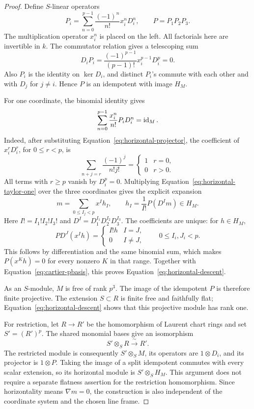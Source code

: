 \begin{proof}
Define \(S\)-linear operators
\begin{equation}
 P_i=\sum_{n=0}^{p-1}\frac{(-1)^n}{n!}x_i^nD_i^n,
 \qquad P=P_1P_2P_3.
 \label{eq:horizontal-projector}
\end{equation}
The multiplication operator \(x_i^n\) is placed on the left.
All factorials here are invertible in \(k\).
The commutator relation gives a telescoping sum
\[
 D_iP_i=\frac{(-1)^{p-1}}{(p-1)!}x_i^{p-1}D_i^p=0.
\]
Also \(P_i\) is the identity on \(\ker D_i\), and distinct
\(P_i\)'s commute with each other and with \(D_j\) for
\(j\ne i\).  Hence \(P\) is an idempotent with image \(H_M\).

For one coordinate, the binomial identity gives
\begin{equation}
 \sum_{n=0}^{p-1}\frac{x_i^n}{n!}P_iD_i^n=\operatorname{id}_M.
 \label{eq:horizontal-taylor-one}
\end{equation}
Indeed, after substituting Equation~\eqref{eq:horizontal-projector},
the coefficient of \(x_i^rD_i^r\), for \(0\le r<p\), is
\[
 \sum_{n+j=r}\frac{(-1)^j}{n!j!}=\begin{cases}1&r=0,\\0&r>0.
 \end{cases}
\]
All terms with \(r\ge p\) vanish by \(D_i^p=0\).
Multiplying Equation~\eqref{eq:horizontal-taylor-one} over the
three coordinates gives the explicit expansion
\begin{equation}
 m=\sum_{0\le I_j<p}x^Ih_I,
 \qquad h_I=\frac1{I!}P(D^I m)\in H_M.
 \label{eq:horizontal-taylor}
\end{equation}
Here \(I!=I_1!I_2!I_3!\) and
\(D^I=D_1^{I_1}D_2^{I_2}D_3^{I_3}\).
The coefficients are unique: for \(h\in H_M\),
\[
 P D^J(x^Ih)=\begin{cases}I!h&I=J,\\0&I\ne J,
 \end{cases}
 \qquad 0\le I_i,J_i<p.
\]
This follows by differentiation and the same binomial sum, which
makes \(P(x^Kh)=0\) for every nonzero \(K\) in that range.
Together with Equation~\eqref{eq:cartier-pbasis}, this proves
Equation~\eqref{eq:horizontal-descent}.

As an \(S\)-module, \(M\) is free of rank \(p^3\).
The image of the idempotent \(P\) is therefore finite projective.
The extension \(S\subset R\) is finite free and faithfully flat;
Equation~\eqref{eq:horizontal-descent} shows that this projective
module has rank one.

For restriction, let \(R\to R'\) be the homomorphism of Laurent
chart rings and set \(S'=(R')^p\).  The shared monomial bases give
an isomorphism
\[
 S'\otimes_S R\xrightarrow{\ \sim\ }R'.
\]
The restricted module is consequently \(S'\otimes_S M\), its
operators are \(1\otimes D_i\), and its projector is
\(1\otimes P\).  Taking the image of a split idempotent commutes
with every scalar extension, so its horizontal module is
\(S'\otimes_S H_M\).  This argument does not require a separate
flatness assertion for the restriction homomorphism.  Since
horizontality means \(\nabla m=0\), the construction is also
independent of the coordinate system and the chosen line frame.
\end{proof}

